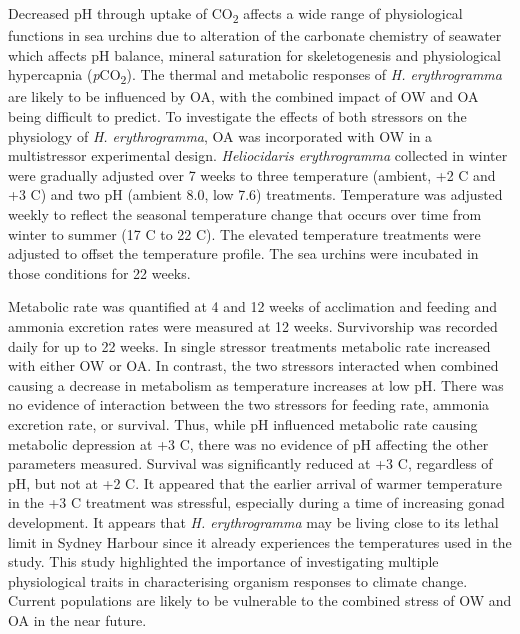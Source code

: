 \documentclass[
  oneside, 11pt, a4paper]{memoir}
\begin{document}
Decreased pH through uptake of CO\textsubscript{2} affects a wide range of physiological functions in sea urchins due to alteration of the carbonate chemistry of seawater which affects pH balance, mineral saturation for skeletogenesis and physiological hypercapnia (\textit{p}CO\textsubscript{2}).
The thermal and metabolic responses of \textit{H. erythrogramma} are likely to be influenced by OA, with the combined impact of OW and OA being difficult to predict.
To investigate the effects of both stressors on the physiology of \textit{H. erythrogramma}, OA was incorporated with OW in a multistressor experimental design.
\textit{Heliocidaris erythrogramma} collected in winter were gradually adjusted over 7 weeks to three temperature (ambient, +2 \degree C and +3 \degree C) and two pH (ambient 8.0, low 7.6) treatments.
Temperature was adjusted weekly to reflect the seasonal temperature change that occurs over time from winter to summer (17 \degree C to 22 \degree C). 
The elevated temperature treatments were adjusted to offset the temperature profile.
The sea urchins were incubated in those conditions for 22 weeks.

Metabolic rate was quantified at 4 and 12 weeks of acclimation and feeding and ammonia excretion rates were measured at 12 weeks. 
Survivorship was recorded daily for up to 22 weeks.
In single stressor treatments metabolic rate increased with either OW or OA.
In contrast, the two stressors interacted when combined causing a decrease in metabolism as temperature increases at low pH.
There was no evidence of interaction between the two stressors for feeding rate, ammonia excretion rate, or survival. 
Thus, while pH influenced metabolic rate causing metabolic depression at +3 \degree C, there was no evidence of pH affecting the other parameters measured. 
Survival was significantly reduced at +3 \degree C, regardless of pH, but not at +2 \degree C. 
It appeared that the earlier arrival of warmer temperature in the +3 \degree C treatment was stressful, especially during a time of increasing gonad development. 
It appears that \textit{H. erythrogramma} may be living close to its lethal limit in Sydney Harbour since it already experiences the temperatures used in the study.
This study highlighted the importance of investigating multiple physiological traits in characterising organism responses to climate change.
Current populations are likely to be vulnerable to the combined stress of OW and OA in the near future.
\end{document}
